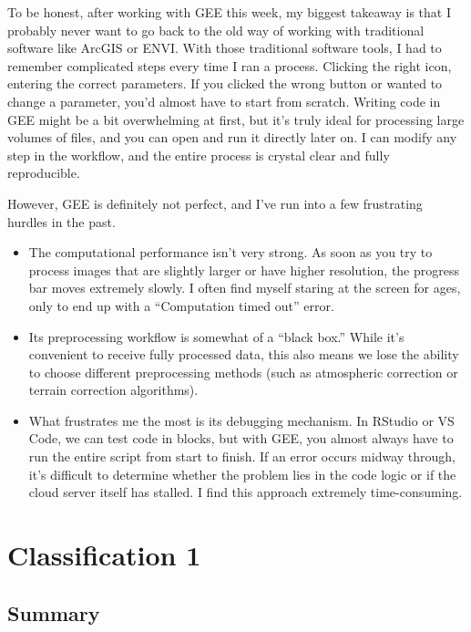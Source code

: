 \documentclass[
  letterpaper,
  DIV=11,
  numbers=noendperiod]{scrreprt}
\begin{document}
To be honest, after working with GEE this week, my biggest takeaway is
that I probably never want to go back to the old way of working with
traditional software like ArcGIS or ENVI. With those traditional
software tools, I had to remember complicated steps every time I ran a
process. Clicking the right icon, entering the correct parameters. If
you clicked the wrong button or wanted to change a parameter, you'd
almost have to start from scratch. Writing code in GEE might be a bit
overwhelming at first, but it's truly ideal for processing large volumes
of files, and you can open and run it directly later on. I can modify
any step in the workflow, and the entire process is crystal clear and
fully reproducible.

However, GEE is definitely not perfect, and I've run into a few
frustrating hurdles in the past.

\begin{itemize}
\item
  The computational performance isn't very strong. As soon as you try to
  process images that are slightly larger or have higher resolution, the
  progress bar moves extremely slowly. I often find myself staring at
  the screen for ages, only to end up with a ``Computation timed out''
  error.
\item
  Its preprocessing workflow is somewhat of a ``black box.'' While it's
  convenient to receive fully processed data, this also means we lose
  the ability to choose different preprocessing methods (such as
  atmospheric correction or terrain correction algorithms).
\item
  What frustrates me the most is its debugging mechanism. In RStudio or
  VS Code, we can test code in blocks, but with GEE, you almost always
  have to run the entire script from start to finish. If an error occurs
  midway through, it's difficult to determine whether the problem lies
  in the code logic or if the cloud server itself has stalled. I find
  this approach extremely time-consuming.
\end{itemize}


\chapter{Classification 1}\label{classification-1}

\section{Summary}\label{summary-2}
\end{document}
